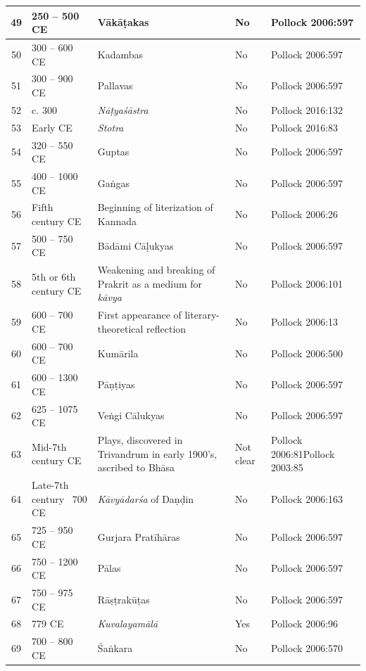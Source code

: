 \begin{longtable}{|c|p{1.9cm}|p{1.9cm}|p{1.5cm}|p{1.1cm}|}
\hline
49 & 250 – 500 CE & Vākāṭakas\index{Vakataka@Vākāṭakas} & No & Pollock 2006:597 \\
\hline
50 & 300 – 600 CE & Kadambas\index{Kadambas} & No & Pollock 2006:597 \\
\hline
51 & 300 – 900 CE & Pallavas\index{Pallavas} & No & Pollock 2006:597 \\
\hline
52 & c. 300 & \textit{Nāṭyaśāstra}\index{Natyasastra@\textit{Nāṭyaśāstra}} & No & Pollock 2016:132 \\
\hline
53 & Early CE & \textit{Stotra} & No & Pollock\index{Pollock, Sheldon} 2016:83 \\
\hline
54 & 320 – 550 CE & Guptas\index{Guptas} & No & Pollock 2006:597 \\
\hline
55 & 400 – 1000 CE & Gaṅgas\index{Gangas@Gaṅgas} & No & Pollock 2006:597 \\
\hline
56 & Fifth century CE & Beginning of literization\index{literization} of Kannada & No & Pollock 2006:26 \\
\hline
57 & 500 – 750 CE & Bādāmi Cāḷukyas\index{Calukyas@Cāḷukyas} & No & Pollock 2006:597 \\
\hline
58 & 5th or 6th century CE & Weakening and breaking of Prakrit as a medium for \textit{kāvya}\index{kavya@\textit{kāvya}} & No & Pollock 2006:101 \\
\hline
59 & 600 – 700 CE & First appearance of literary-theoretical reflection & No & Pollock 2006:13 \\
\hline
60 & 600 – 700 CE & Kumārila\index{Kumarila Bhatta@Kumārila Bhaṭṭa} & No & Pollock 2006:500 \\
\hline
61 & 600 – 1300 CE & Pāṇṭiyas\index{Pantiyas@Pāṇṭiyas} & No & Pollock 2006:597 \\
\hline
62 & 625 – 1075 CE & Veṅgi Cālukyas\index{Calukyas@Cālukyas} & No & Pollock 2006:597 \\
\hline
63 & Mid-7th century CE  & Plays, discovered in Trivandrum in early 1900’s, ascribed to Bhāsa\index{Bhasa@Bhāsa} & Not clear & Pollock 2006:81\break  Pollock 2003:85 \\
\hline
64 & Late-7th century ~700 CE & \textit{Kāvyādarśa}\index{Kavyadarsa@\textit{Kāvyādarśa}} of Daṇḍin\index{Dandin@Daṇḍin} & No & Pollock\index{Pollock, Sheldon} 2006:163 \\
\hline
65 & 725 – 950 CE & Gurjara Pratīhāras\index{Pratiharas@Pratīhāras} & No & Pollock 2006:597 \\
\hline
66 & 750 – 1200 CE & Pālas\index{Palas@Pālas} & No & Pollock 2006:597 \\
\hline
67 & 750 – 975 CE & Rāṣṭrakūṭas\index{Rastrakutas@Rāṣṭrakūṭas} & No & Pollock 2006:597 \\
\hline
68 & 779 CE & \textit{Kuvalayamālā}\index{Kuvalayamala@\textit{Kuvalayamālā}} & Yes & Pollock 2006:96 \\
\hline
69 & 700 – 800 CE & Śaṅkara\index{Sankara@Śaṅkara} & No & Pollock 2006:570 \\
\hline
\end{longtable}

